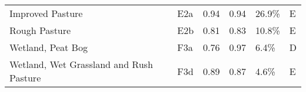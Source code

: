 \begin{tabular}{llllll}
                          Improved Pasture &           E2a &                 0.94 &               0.94 &                    26.9\% &                   E \\
                             Rough Pasture &           E2b &                 0.81 &               0.83 &                    10.8\% &                   E \\
                         Wetland, Peat Bog &           F3a &                 0.76 &               0.97 &                     6.4\% &                   D \\
   Wetland, Wet Grassland and Rush Pasture &           F3d &                 0.89 &               0.87 &                     4.6\% &                   E \\
\bottomrule
\end{tabular}

